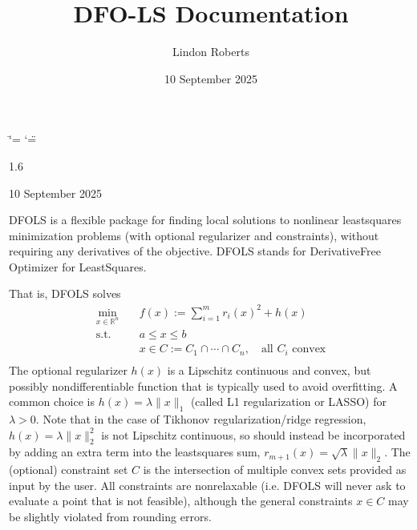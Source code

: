 \documentclass[letterpaper,10pt,english]{sphinxmanual}
\title{DFO-LS Documentation}
\date{10 September 2025}
\author{Lindon Roberts}
\begin{document}
\ifdefined\shorthandoff
  \ifnum\catcode`\=\string=\active\shorthandoff{=}\fi
  \ifnum\catcode`\"=\active{}\fi
\fi

\pagestyle{empty}
\sphinxmaketitle
\pagestyle{plain}
\sphinxtableofcontents
\pagestyle{normal}
\label{\detokenize{index::doc}}


\sphinxAtStartPar
{} 1.6

\sphinxAtStartPar
{} 10 September 2025

\sphinxAtStartPar
{} 

\sphinxAtStartPar
DFO\sphinxhyphen{}LS is a flexible package for finding local solutions to nonlinear least\sphinxhyphen{}squares minimization problems (with optional regularizer and constraints), without requiring any derivatives of the objective. DFO\sphinxhyphen{}LS stands for Derivative\sphinxhyphen{}Free Optimizer for Least\sphinxhyphen{}Squares.

\sphinxAtStartPar
That is, DFO\sphinxhyphen{}LS solves
\begin{equation*}
\begin{split}\min_{x\in\mathbb{R}^n}  &\quad  f(x) := \sum_{i=1}^{m}r_{i}(x)^2 + h(x) \\
\text{s.t.} &\quad  a \leq x \leq b\\
            &\quad x \in C := C_1 \cap \cdots \cap C_n, \quad \text{all $C_i$ convex}\\\end{split}
\end{equation*}
\sphinxAtStartPar
The optional regularizer \(h(x)\) is a Lipschitz continuous and convex, but possibly non\sphinxhyphen{}differentiable function that is typically used to avoid overfitting.
A common choice is \(h(x)=\lambda \|x\|_1\) (called L1 regularization or LASSO) for \(\lambda>0\).
Note that in the case of Tikhonov regularization/ridge regression, \(h(x)=\lambda\|x\|_2^2\) is not Lipschitz continuous, so should instead be incorporated by adding an extra term into the least\sphinxhyphen{}squares sum, \(r_{m+1}(x)=\sqrt{\lambda} \|x\|_2\).
The (optional) constraint set \(C\) is the intersection of multiple convex sets provided as input by the user. All constraints are non\sphinxhyphen{}relaxable (i.e. DFO\sphinxhyphen{}LS will never ask to evaluate a point that is not feasible), although the general constraints \(x\in C\) may be slightly violated from rounding errors.
\end{document}
